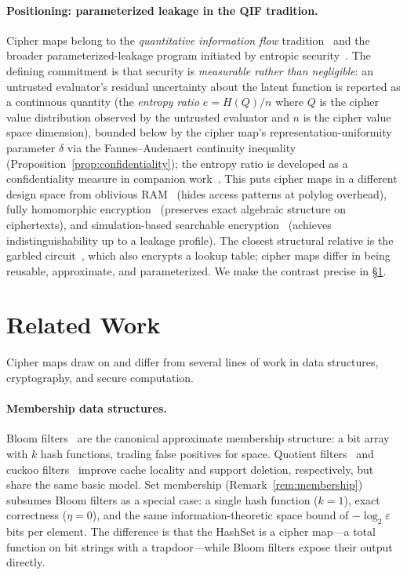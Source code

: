 \documentclass[11pt]{article}
\theoremstyle{definition}
\theoremstyle{plain}
\theoremstyle{remark}
\begin{document}
\paragraph{Positioning: parameterized leakage in the QIF tradition.}
Cipher maps belong to the \emph{quantitative information flow}
tradition~\cite{smith2009foundations,alvim2012measuring} and the broader
parameterized-leakage program initiated by entropic
security~\cite{dodis2005entropic}.  The defining commitment is that
security is \emph{measurable rather than negligible}: an untrusted
evaluator's residual uncertainty about the latent function is reported as
a continuous quantity (the \emph{entropy ratio} $e = H(Q)/n$ where $Q$
is the cipher value distribution observed by the untrusted evaluator
and $n$ is the cipher value space dimension), bounded below by the
cipher map's representation-uniformity parameter $\delta$ via the
Fannes--Audenaert continuity inequality
(Proposition~\ref{prop:confidentiality}); the entropy ratio is developed
as a confidentiality measure in companion work~\cite{towell2026maxconf}.  This puts
cipher maps in a different design space from oblivious
RAM~\cite{goldreich1996software} (hides access patterns at polylog
overhead), fully homomorphic encryption~\cite{gentry2009fully} (preserves
exact algebraic structure on ciphertexts), and simulation-based
searchable encryption~\cite{curtmola2006searchable} (achieves
indistinguishability up to a leakage profile).  The closest structural
relative is the garbled circuit~\cite{yao1982protocols}, which also
encrypts a lookup table; cipher maps differ in being reusable,
approximate, and parameterized.  We make the contrast precise in
\S\ref{sec:related}.


\section{Related Work}
\label{sec:related}

Cipher maps draw on and differ from several lines of work in data
structures, cryptography, and secure computation.

\paragraph{Membership data structures.}
Bloom filters~\cite{bloom1970space} are the canonical approximate membership
structure: a bit array with $k$ hash functions, trading false positives for
space.  Quotient filters~\cite{bender2012quotient} and cuckoo
filters~\cite{fan2014cuckoo} improve cache locality and support deletion,
respectively, but share the same basic model.  Set membership (Remark~\ref{rem:membership}) subsumes Bloom filters as a special
case: a single hash function ($k=1$), exact correctness ($\eta=0$), and the
same information-theoretic space bound of $-\log_2\varepsilon$ bits per
element.  The difference is that the HashSet is a cipher map---a total
function on bit strings with a trapdoor---while Bloom filters expose their
output directly.
\end{document}
